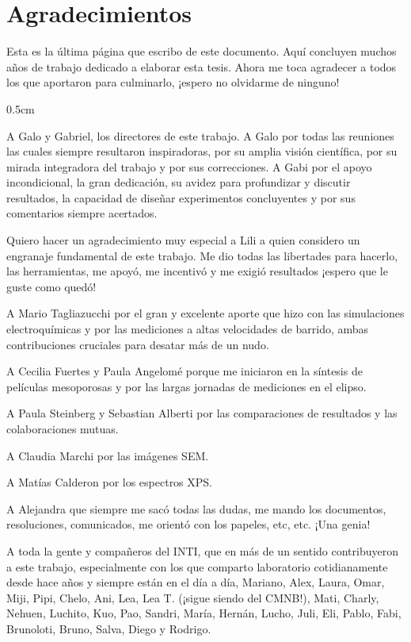\vfill
\cleardoublepage

\mtcaddchapter[Agradecimientos]	

\section*{\centering Agradecimientos} 

 \noindent Esta es la última página que escribo de este documento. Aquí concluyen muchos años de trabajo dedicado a elaborar esta tesis. Ahora me toca agradecer a todos los que aportaron para culminarlo, ¡espero no olvidarme de ninguno!

	 \begin{sangria_pers}{0.5cm}

	 A Galo y Gabriel, los directores de este trabajo. A Galo por todas las reuniones las cuales siempre resultaron inspiradoras, por su amplia visión científica, por su mirada integradora del trabajo y por sus correcciones. \linebreak A Gabi por el apoyo incondicional, la gran dedicación, su avidez para profundizar y discutir resultados, la capacidad de diseñar experimentos concluyentes y por sus comentarios siempre acertados.

	 Quiero hacer un agradecimiento muy especial a Lili a quien considero un engranaje fundamental de este trabajo. Me dio todas las libertades para hacerlo, las herramientas, me apoyó, me incentivó y me exigió resultados ¡espero que le guste como quedó!

	 A Mario Tagliazucchi por el gran y excelente aporte que hizo con las simulaciones electroquímicas y por las mediciones a altas velocidades de barrido, ambas contribuciones cruciales para desatar más de un nudo.  

	 A Cecilia Fuertes y Paula Angelomé porque me iniciaron en la síntesis de películas mesoporosas y por las largas jornadas de mediciones en el elipso.

	 A Paula Steinberg y Sebastian Alberti por las comparaciones de resultados y las colaboraciones mutuas.

	 A Claudia Marchi por las imágenes SEM.

	 A Matías Calderon por los espectros XPS.

	 A Alejandra que siempre me sacó todas las dudas, me mando los documentos, resoluciones, comunicados, me orientó con los papeles, etc, etc. ¡Una genia!

	 A toda la gente y compañeros del INTI, que en más de un sentido contribuyeron a este trabajo, especialmente con los que comparto laboratorio cotidianamente desde hace años y siempre están en el día a día, Mariano, Alex, Laura, Omar, Miji, Pipi, Chelo, Ani, Lea, Lea T. (¡sigue siendo del CMNB!), Mati, Charly, Nehuen, Luchito, Kuo, Pao, Sandri, María, Hernán, Lucho, Juli, Eli, Pablo, Fabi, Brunoloti, Bruno, Salva, Diego y Rodrigo.


\end{sangria_pers}
